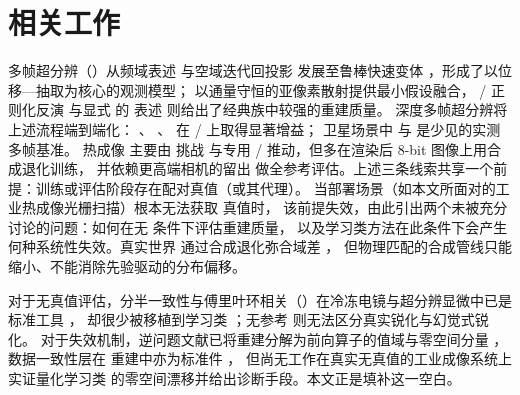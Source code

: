 \section{相关工作}

多帧超分辨（）从频域表述 \cite{tsai1984multiframe} 与空域迭代回投影 \cite{irani1991improving}
发展至鲁棒快速变体 \cite{farsiu2004fast}，形成了以位移----抽取为核心的观测模型；
 \cite{fruchter2002drizzle} 以通量守恒的亚像素散射提供最小假设融合，
/ 正则化反演 \cite{rudin1992nonlinear,bredies2010tgv} 与显式  的  表述
\cite{elad1997restoration,hardie1997joint} 则给出了经典族中较强的重建质量。
深度多帧超分辨将上述流程端到端化： \cite{bhat2021deep}、 \cite{dudhane2022burst}、
 \cite{dudhane2023burstormer} 在 / 上取得显著增益；
卫星场景中  与  \cite{deudon2020highres,salvetti2020rams} 是少见的实测多帧基准。
热成像  主要由  挑战 \cite{rivadeneira2020thermal,rivadeneira2023thermal} 与专用 /
\cite{chudasama2020therisurnet,rivadeneira2020novel} 推动，但多在渲染后 8-bit 图像上用合成退化训练，
并依赖更高端相机的留出  做全参考评估。上述三条线索共享一个前提：训练或评估阶段存在配对真值（或其代理）。
当部署场景（如本文所面对的工业热成像光栅扫描）根本无法获取  真值时，
该前提失效，由此引出两个未被充分讨论的问题：如何在无  条件下评估重建质量，
以及学习类方法在此条件下会产生何种系统性失效。真实世界  通过合成退化弥合域差 \cite{bellkligler2019blind,wang2021real,zhang2021designing}，
但物理匹配的合成管线只能缩小、不能消除先验驱动的分布偏移。

对于无真值评估，分半一致性与傅里叶环相关（）在冷冻电镜与超分辨显微中已是标准工具
\cite{vanheel2005fourier,nieuwenhuizen2013measuring,banterle2013fourier}，
却很少被移植到学习类 ；无参考  \cite{mittal2013making} 则无法区分真实锐化与幻觉式锐化。
对于失效机制，逆问题文献已将重建分解为前向算子的值域与零空间分量
\cite{schwab2019deep,chen2021equivariant,ulyanov2018deep,heckel2019deep}，
数据一致性层在  重建中亦为标准件 \cite{schlemper2018deep}，
但尚无工作在真实无真值的工业成像系统上实证量化学习类  的零空间漂移并给出诊断手段。本文正是填补这一空白。
